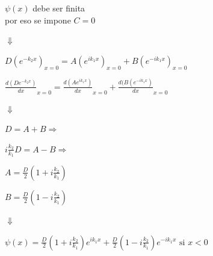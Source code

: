 \documentclass[oneside]{book}
\numberwithin{equation}{section}
\numberwithin{figure}{section}
\numberwithin{table}{section}
\begin{document}
				\vspace{3cm}

				\begin{minipage}[t]{0.5\textwidth}
					\begin{center}
						$\psi(x)$ debe ser finita\\
						por eso se impone $C=0$
					\end{center}
					\begin{center}
						$\Downarrow$
					\end{center}
					\begin{center}
						$\displaystyle D(e^{-k_2x})_{x=0}=A(e^{ik_1x})_{x=0}+B(e^{-ik_1x})_{x=0}$
					\end{center}
					\begin{center}
						$\displaystyle \frac{d(De^{-k_2x})}{dx}_{x=0}=\frac{d(Ae^{ik_1x})}{dx}_{x=0}+\frac{d(B(e^{-ik_1x})}{dx}_{x=0}$
					\end{center}
					\begin{center}
						$\Downarrow$
					\end{center}
					\begin{center}
						\begin{minipage}[t]{0.3\textwidth}
							\begin{center}
								$D=A+B \Rightarrow$
							\end{center}
							\begin{center}
								$\displaystyle i\frac{k_2}{k_1}D=A-B \Rightarrow$
							\end{center}					
						\end{minipage}	
						\begin{minipage}[t]{0.3\textwidth}
							\begin{center}
								$\displaystyle A=\frac{D}{2}(1+i\frac{k_2}{k_1})$
							\end{center}
							\begin{center}
								$\displaystyle B=\frac{D}{2}(1-i\frac{k_2}{k_1})$
							\end{center}
						\end{minipage}	
					\end{center}			
					\begin{center}
						$\Downarrow$
					\end{center}
					\begin{center}
						$\displaystyle \psi(x)=\frac{D}{2}(1+i\frac{k_2}{k_1})e^{ik_1x}+\frac{D}{2}(1-i\frac{k_2}{k_1})e^{-ik_1x} \text{ si } x<0$
					\end{center}
					\begin{center}

\end{center}
\end{minipage}
\end{document}
